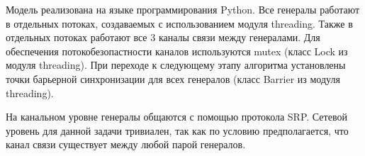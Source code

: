Модель реализована на языке программирования Python. Все генералы работают в отдельных потоках, создаваемых с использованием модуля threading. Также в отдельных потоках работают все 3 каналы связи между генералами. Для обеспечения потокобезопастности каналов используются mutex (класс Lock из модуля threading). При переходе к следующему этапу алгоритма установлены точки барьерной синхронизации для всех генералов (класс Barrier из модуля threading).

На канальном уровне генералы общаются с помощью протокола SRP. Сетевой уровень для данной задачи тривиален, так как по условию предполагается, что канал связи существует между любой парой генералов. 
